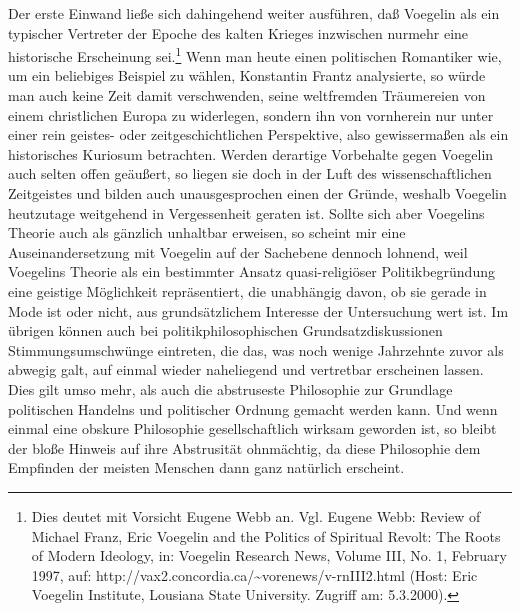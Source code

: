 Der erste Einwand ließe sich dahingehend weiter ausführen, daß Voegelin als
ein typischer Vertreter der Epoche des kalten Krieges inzwischen nurmehr eine
historische Erscheinung sei.\footnote{Dies deutet mit Vorsicht Eugene Webb an.
  Vgl. Eugene Webb: Review of Michael Franz, Eric Voegelin and the Politics of
  Spiritual Revolt: The Roots of Modern Ideology, in: Voegelin Research News,
  Volume III, No. 1, February 1997, auf:
  http://vax2.concordia.ca/\~{ }vorenews/v-rnIII2.html (Host: Eric Voegelin
  Institute, Lousiana State University. Zugriff am: 5.3.2000).} Wenn man heute
einen politischen Romantiker wie, um ein beliebiges Beispiel zu wählen,
Konstantin Frantz analysierte, so würde man auch keine Zeit damit
verschwenden, seine weltfremden Träumereien von einem christlichen Europa zu
widerlegen, sondern ihn von vornherein nur unter einer rein geistes- oder
zeitgeschichtlichen Perspektive, also gewissermaßen als ein historisches
Kuriosum betrachten. Werden derartige Vorbehalte gegen Voegelin auch selten
offen geäußert, so liegen sie doch in der Luft des wissenschaftlichen
Zeitgeistes und bilden auch unausgesprochen einen der Gründe, weshalb Voegelin
heutzutage weitgehend in Vergessenheit geraten ist. Sollte sich aber Voegelins
Theorie auch als gänzlich unhaltbar erweisen, so scheint mir eine
Auseinandersetzung mit Voegelin auf der Sachebene dennoch lohnend, weil
Voegelins Theorie als ein bestimmter Ansatz quasi-religiöser Politikbegründung
eine geistige Möglichkeit repräsentiert, die unabhängig davon, ob sie gerade
in Mode ist oder nicht, aus grundsätzlichem Interesse der Untersuchung wert
ist. Im übrigen können auch bei politikphilosophischen Grundsatzdiskussionen
Stimmungsumschwünge eintreten, die das, was noch wenige Jahrzehnte zuvor als
abwegig galt, auf einmal wieder naheliegend und vertretbar erscheinen lassen.
Dies gilt umso mehr, als auch die abstruseste Philosophie zur Grundlage
politischen Handelns und politischer Ordnung gemacht werden kann. Und wenn
einmal eine obskure Philosophie gesellschaftlich wirksam geworden ist, so
bleibt der bloße Hinweis auf ihre Abstrusität ohnmächtig, da diese Philosophie
dem Empfinden der meisten Menschen dann ganz natürlich erscheint.

